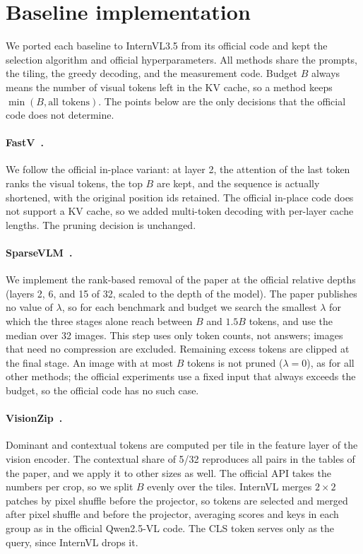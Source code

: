 \section{Baseline implementation}
\label{sec:baselines}

We ported each baseline to InternVL3.5 from its official code and kept the selection algorithm and official
hyperparameters. All methods share the prompts, the tiling, the greedy decoding, and the measurement code. Budget
$B$ always means the number of visual tokens left in the KV cache, so a method keeps $\min(B,\text{all tokens})$.
The points below are the only decisions that the official code does not determine.

\paragraph{FastV~\cite{fastv}.}
We follow the official in-place variant: at layer 2, the attention of the last token ranks the visual tokens, the top
$B$ are kept, and the sequence is actually shortened, with the original position ids retained. The official in-place
code does not support a KV cache, so we added multi-token decoding with per-layer cache lengths. The pruning
decision is unchanged.

\paragraph{SparseVLM~\cite{sparsevlm}.}
We implement the rank-based removal of the paper at the official relative depths (layers 2, 6, and 15 of 32, scaled
to the depth of the model). The paper publishes no value of $\lambda$, so for each benchmark and budget we search the
smallest $\lambda$ for which the three stages alone reach between $B$ and $1.5B$ tokens, and use the median over 32
images. This step uses only token counts, not answers; images that need no compression are excluded. Remaining
excess tokens are clipped at the final stage. An image with at most $B$ tokens is not pruned ($\lambda=0$), as for
all other methods; the official experiments use a fixed input that always exceeds the budget, so the official code has
no such case.

\paragraph{VisionZip~\cite{visionzip}.}
Dominant and contextual tokens are computed per tile in the feature layer of the vision encoder. The contextual
share of 5/32 reproduces all pairs in the tables of the paper, and we apply it to other sizes as well. The official API
takes the numbers per crop, so we split $B$ evenly over the tiles. InternVL merges $2\times2$ patches by pixel shuffle before the
projector, so tokens are selected and merged after pixel shuffle and before the projector, averaging scores and keys in
each group as in the official Qwen2.5-VL code. The CLS token serves only as the query, since InternVL drops it.

